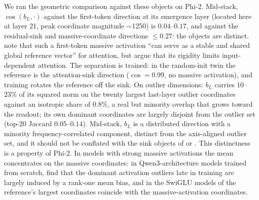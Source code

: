 \documentclass[11pt]{article}
\newcommand{\bl}{b_L}
\begin{document}
We ran the geometric comparison against these objects on Phi-2.
Mid-stack, $\cos(\bl, \cdot)$ against the first-token direction at its
emergence layer (located here at layer 21, peak coordinate magnitude
$\sim$1250) is $0.04$--$0.17$, and against the residual-sink and
massive-coordinate directions $\leq 0.27$: the objects are distinct.
\citet{shi2026} note that such a first-token massive activation ``can
serve as a stable and shared global reference vector'' for attention,
but argue that its rigidity limits input-dependent attention.
The separation is trained: in the random-init twin the reference
is the attention-sink direction ($\cos = 0.99$, no massive activation), and
training rotates the reference off the sink. On outlier dimensions:
$\bl$ carries $10$--$23\%$ of its squared norm on the twenty largest
last-layer outlier coordinates against an isotropic share of $0.8\%$,
a real but minority overlap that grows toward the readout; its own
dominant coordinates are largely disjoint from the outlier set (top-20
Jaccard $0.05$--$0.14$). Mid-stack, $\bl$ is a distributed direction
with a minority frequency-correlated component, distinct from the
axis-aligned outlier set, and it should not be conflated with the sink objects of
\citet{qiu2026} or \citet{shi2026}. This distinctness is a property of
Phi-2. In models with strong massive activations the mean concentrates
on the massive coordinates: in Qwen3-architecture models trained from
scratch, \citet{cao2026meanbias} find that the dominant activation
outliers late in training are largely induced by a rank-one mean bias,
and in the SwiGLU models of \citet{tuomi2026backgroundglu} the
reference's largest coordinates coincide with the massive-activation
coordinates.
\end{document}
